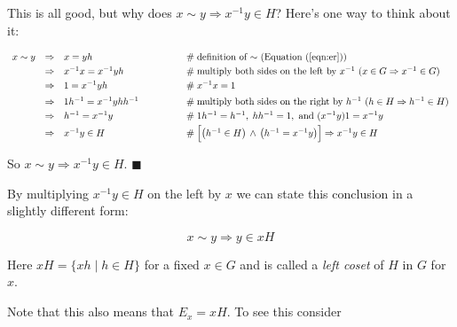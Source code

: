 \documentclass{article}
\theoremstyle{definition}
\begin{document}
\bigskip
\noindent
This is all good, but why does $x \sim y \Rightarrow x^{-1}y \in H$?
Here's one way to think about it:


\begin{equation*}
\begin{array}{llll}
x \sim y
&\Rightarrow& x = yh					&\hspace{4em} \mathrel{\#} 
												\text{definition of $\sim$ (Equation (\ref{eqn:er}))} \\
[3pt]
&\Rightarrow& x^{-1}x = x^{-1}yh		&\hspace{4em} \mathrel{\#} 
												\text{multiply both sides on the left by $x^{-1}$ 
												($x \in G \Rightarrow x^{-1} \in G$)} \\
[3pt]
&\Rightarrow& 1 = x^{-1}yh				&\hspace{4em} \mathrel{\#} x^{-1}x = 1 \\
[5pt]
&\Rightarrow& 1h^{-1} = x^{-1}yh h^{-1}	&\hspace{4em} \mathrel{\#} \text{multiply both sides on the right 
												by $h^{-1}$ ($h \in H \Rightarrow h^{-1} \in H$)} \\
[3pt]
&\Rightarrow& h^{-1} = x^{-1}y			&\hspace{4em} \mathrel{\#} 1h^{-1} = h^{-1},\; hh^{-1} = 1,
												\text{ and } (x^{-1}y)1 = x^{-1}y \\
[3pt]
&\Rightarrow& x^{-1}y \in H				&\hspace{4em} \mathrel{\#} \left [ \left ( h^{-1} \in H \right )  \, \land \, 
												\left ( h^{-1} = x^{-1}y \right ) \right ]  \Rightarrow x^{-1}y \in H
\end{array}
\end{equation*}

\smallskip
\noindent
So $x \sim y \Rightarrow x^{-1}y \in H$. $\blacksquare$

\bigskip
\noindent
By multiplying $x^{-1}y \in H$ on the left by $x$ we can state this conclusion 
in a slightly different form: 

\begin{equation*}
x \sim y \Rightarrow y \in xH
\end{equation*}

\medskip
\noindent
Here $xH = \{xh \mid h \in H\}$ for a fixed $x \in G$ and 
is called a \emph{left coset} of $H$ in $G$ for $x$. 

\bigskip
\noindent
Note that this also means that $E_x = xH$. To see this consider
\end{document}
